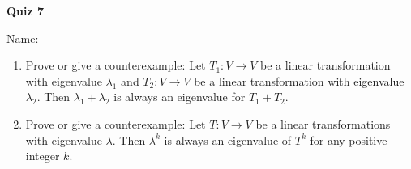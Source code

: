 \documentclass{article}
\begin{document}
\begin{center}
    {\bf Quiz 7}
\end{center}
Name:


\begin{enumerate}
    \item
        Prove or give a counterexample: Let $T_1:V\to V$ be a linear
        transformation with eigenvalue $\lambda_1$ and $T_2:V\to V$ be a linear
        transformation with eigenvalue $\lambda_2$. Then $\lambda_1+\lambda_2$
        is always an eigenvalue for $T_1+T_2$.
        \vfill
    \item
        Prove or give a counterexample: Let $T:V\to V$ be a linear
        transformations with eigenvalue $\lambda$. Then $\lambda^k$ is always
        an eigenvalue of $T^k$ for any positive integer $k$.
        \vfill
\end{enumerate}
    
\end{document}
